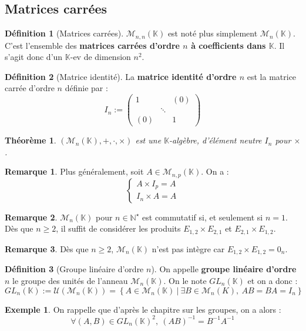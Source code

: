 \documentclass[french]{book}
\newcommand{\N}{\mathbb{N}}
\newcommand{\K}{\mathbb{K}}
\newcommand{\st}{^\star}
\newcommand{\inv}{^{-1}}
\theoremstyle{plain}
\newtheorem{thm}{Théorème}[chapter]
\theoremstyle{definition}
\newtheorem{dfn}{Définition}[chapter]
\newtheorem{exa}{Exemple}[chapter]
\newtheorem{rmq}{Remarque}[chapter]
\theoremstyle{remark}
\begin{document}
\subsection{Matrices carrées}
\begin{dfn}[Matrices carrées]
	$\mathcal{M}_{n,n}(\K)$ est noté plus simplement $\mathcal{M}_n(\K)$. C'est l'ensemble des \textbf{matrices carrées d'ordre $n$ à coefficients dans $\K$}. Il s'agit donc d'un $\K$-ev de dimension $n^2$.
\end{dfn}
\begin{dfn}[Matrice identité]
	La \textbf{matrice identité d'ordre $n$} est la matrice carrée d'ordre $n$ définie par : $$I_n:=\begin{pmatrix}1&&(0)\\&\ddots&\\ (0)&&1\end{pmatrix}$$
\end{dfn}
\begin{thm}
	$(\mathcal{M}_n(\K),+,\cdot,\times)$ est une $\K$-algèbre, d'élément neutre $I_n$ pour $\times$.
\end{thm}
\begin{rmq}
	Plus généralement, soit $A\in\mathcal{M}_{n,p}(\K)$. On a : $$\begin{cases}
		A\times I_p=A\\ I_n\times A=A
	\end{cases}$$
\end{rmq}
\begin{rmq}
	$\mathcal{M}_n(\K)$ pour $n\in\N\st$ est commutatif si, et seulement si $n=1$. Dès que $n\geqslant2$, il suffit de considérer les produits $E_{1,2}\times E_{2,1}$ et $E_{2,1}\times E_{1,2}$.
\end{rmq}
\begin{rmq}
	Dès que $n\geqslant2$, $\mathcal{M}_n(\K)$ n'est pas intègre car $E_{1,2}\times E_{1,2}=0_n$.
\end{rmq}
\begin{dfn}[Groupe linéaire d'ordre $n$]
	On appelle \textbf{groupe linéaire d'ordre $n$} le groupe des unités de l'anneau $\mathcal{M}_n(\K)$. On le note $GL_n(\K)$ et on a donc : $$GL_n(\K):=\mathcal{U}\left(\mathcal{M}_n(\K)\right)=\left\{A\in\mathcal{M}_n(\K)\ | \ \exists B\in\mathcal{M}_n(K),\ AB=BA=I_n\right\}$$
\end{dfn}
\begin{exa}
	On rappelle que d'après le chapitre sur les groupes, on a alors : $$\forall(A,B)\in GL_n(\K)^2,\ (AB)\inv=B\inv A\inv$$
\end{exa}
\end{document}
